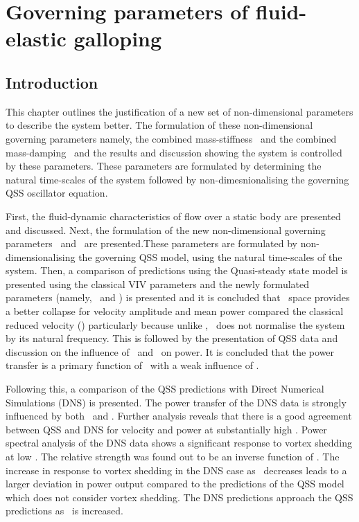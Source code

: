 \chapter{Governing parameters of  fluid-elastic galloping}
\label{chap:goven_para}

\section{Introduction}

This chapter outlines the justification of a new set of non-dimensional parameters to describe the system better. The formulation of these non-dimensional governing parameters namely, the combined mass-stiffness \massstiff \ and the combined mass-damping \massdamp \ and the results and discussion showing the system is controlled by these parameters. These parameters are formulated by determining the natural time-scales of the system followed by non-dimesnionalising the governing QSS oscillator equation.  

First, the fluid-dynamic characteristics of flow over a static body are presented and discussed. Next, the formulation of the new non-dimensional governing parameters \massstiff\ and \massdamp\ are presented.These parameters are formulated by non-dimensionalising the governing QSS model, using the natural time-scales of the system. Then, a comparison of predictions using the Quasi-steady state model is presented using the classical VIV parameters and the newly formulated parameters (namely, \massstiff \ and \massdamp) is presented and it is concluded that \massdamp\ space provides a better collapse for velocity amplitude and mean power compared the classical reduced velocity (\ustar) particularly because unlike \ustar, \massdamp\ does not normalise the system by its natural frequency. This is followed by the presentation of QSS data and discussion on the influence of \massstiff \ and \massdamp \ on power. It is concluded that the power transfer is a primary function of \massdamp \ with a weak influence of \massstiff.

Following this, a comparison of the QSS predictions with Direct Numerical Simulations (DNS) is presented. The power transfer of the DNS data is strongly influenced by both \massstiff \ and \massdamp. Further analysis reveals that there is a good agreement between QSS and DNS for velocity and power at substantially high \massstiff. Power spectral analysis of the DNS data shows a significant response to vortex shedding at low \massstiff. The relative strength was found out to be an inverse function of \massstiff. The increase in response to vortex shedding in the DNS case as \massstiff\ decreases leads to a larger deviation in power output compared to the predictions of the QSS model which does not consider vortex shedding. The DNS predictions approach the QSS predictions as \massstiff\ is increased.  


